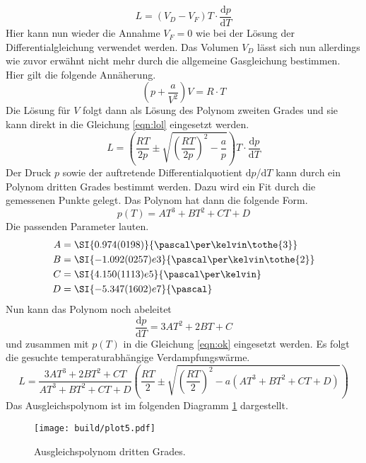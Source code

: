 \begin{equation}
    \label{eqn:lol}
L = (V_{D}-V_{F})T \cdot \frac{\text{d}p}{\text{d}T}
\end{equation}
Hier kann nun wieder die Annahme $V_{F} = 0$ wie bei der Lösung der Differentialgleichung verwendet werden. Das Volumen $V_{D}$ lässt sich nun allerdings wie zuvor erwähnt nicht mehr
durch die allgemeine Gasgleichung bestimmen. Hier gilt die folgende Annäherung.
\begin{equation}
\left( p + \frac{a}{V^{2}}\right)V = R \cdot T 
\end{equation}
Die Lösung für $V$ folgt dann als Lösung des Polynom zweiten Grades und sie kann direkt in die Gleichung \eqref{eqn:lol} eingesetzt werden.
\begin{equation}
    \label{eqn:ok}
L = \left(\frac{RT}{2p} \pm \sqrt{\left( \frac{RT}{2p}\right)^2 -\frac{a}{p}}\right) T \cdot \frac{\text{d}p}{\text{d}T}
\end{equation}
Der Druck $p$ sowie der auftretende Differentialquotient $\text{d}p$/$\text{d}T$ kann durch ein Polynom dritten Grades bestimmt werden. Dazu wird ein
Fit durch die gemessenen Punkte gelegt. Das Polynom hat dann die folgende Form.
\begin{equation}
p(T) = AT^{3} + BT^{2} + CT + D
\end{equation}
Die passenden Parameter lauten.
\begin{align*}
    A &= \SI{0.974(0198)}{\pascal\per\kelvin\tothe{3}} \\
    B &= \SI{-1.092(0257)e3}{\pascal\per\kelvin\tothe{2}} \\
    C &= \SI{4.150 (1113)e5}{\pascal\per\kelvin}\\
    D &=  \SI{-5.347 (1602)e7}{\pascal} \\
\end{align*}
Nun kann das Polynom noch abeleitet
\begin{equation}
\frac{\text{d}p}{\text{d}T} = 3AT^{2} + 2BT + C
\end{equation}
und zusammen mit $p(T)$ in die Gleichung \eqref{eqn:ok} eingesetzt werden.
Es folgt die gesuchte temperaturabhängige Verdampfungswärme.
\begin{equation}
L = \frac{3AT^{3} + 2BT^{2} + CT}{AT^{3} + BT^{2} + CT + D}\left(\frac{RT}{2} \pm \sqrt{\left( \frac{RT}{2}\right)^{2} -a(AT^{3} + BT^{2} + CT + D)}\right) 
\end{equation}
Das Ausgleichspolynom ist im folgenden Diagramm \ref{fig:plot5} dargestellt.
\begin{figure}[h]
    \centering
    \texttt{[image: build/plot5.pdf]}
    \caption{Ausgleichspolynom dritten Grades.}
    \label{fig:plot5}
\end{figure}
